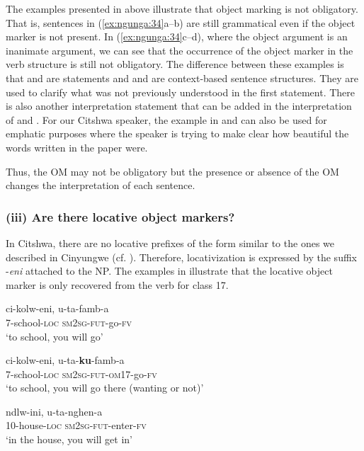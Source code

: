 \documentclass[output=paper]{langscibook}
\begin{document}
The examples presented in  above illustrate that object marking is not obligatory. That is, sentences in (\ref{ex:ngunga:34}a--b) are still grammatical even if the object marker is not present. In (\ref{ex:ngunga:34}c--d), where the object argument is an inanimate argument, we can see that the occurrence of the object marker in the verb structure is still not obligatory. The difference between these examples is that  and  are statements and  and  are context-based sentence structures. They are used to clarify what was not previously understood in the first statement. There is also another interpretation statement that can be added in the interpretation of  and . For our Citshwa speaker, the example in  and  can also be used for emphatic purposes where the speaker is trying to make clear how beautiful the words written in the paper were. 

Thus, the OM may not be obligatory but the presence or absence of the OM changes the interpretation of each sentence. 

\subsubsection{(iii) Are there locative object markers?}

In Citshwa, there are no locative prefixes of the form similar to the ones we described in Cinyungwe (cf. ). Therefore, locativization is expressed by the suffix -\textit{eni} attached to the NP. The examples in  illustrate that the locative object marker is only recovered from the verb for class 17.

\ea\label{ex:ngunga:35}
\ea\label{ex:ngunga:35a} \gll ci-kolw-eni,   u-ta-famb-a \\
7-school-\textsc{loc}  {\textsc{sm2sg}-\textsc{fut}}{}-go-{\textsc{fv}}   \\
\glt ‘to school, you will go’


\ex\label{ex:ngunga:35b}
\gll ci-kolw-eni,   u-ta-\textbf{ku}{}-famb-a  \\
7-school-\textsc{loc}  {\textsc{sm2sg}-\textsc{fut}}{}-{\textsc{om}17}{}-go-{\textsc{fv}}   \\
\glt ‘to school, you will go there (wanting or not)’


\ex\label{ex:ngunga:35c}
\gll ndlw-ini,   u-ta-nghen-a  \\
10-house-\textsc{loc}  {\textsc{sm2sg}-\textsc{fut}}{}-enter-{\textsc{fv}}   \\
\glt ‘in the house, you will get in’
\end{document}

